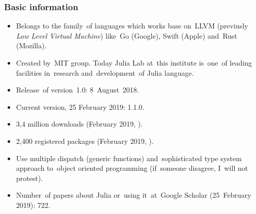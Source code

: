 \documentclass[10pt,t]{beamer}
\begin{document}
\begin{frame}
  \frametitle{Basic information}


  \begin{itemize}
    \RaggedRight

  \item Belongs to the family~of languages which works base on~LLVM
    (previusly \textit{Low Level Virtual Machine}) like~Go (Google),
    Swift (Apple) and~Rust (Mozilla).

  \item Created by~MIT group. Today Julia Lab at~this institute
    is~one~of leading facilities in~research and~development~of
    Julia language.

  \item Release~of version~1.0: 8~August~2018.

  \item Current version, 25 February 2019: 1.1.0.

  \item 3,4 million downloads (February 2019,
    ).

  \item 2,400 registered packages (February 2019,
    ).

  \item Use multiple dispatch (generic functions) and~sophisticated
    type system approach to~object oriented programming (if~someone
    disagree, I~will not protest).

  \item Number~of papers about Julia or~using it~at~Google Scholar
    (25~February 2019): 722.

  \end{itemize}

\end{frame}
\end{document}
